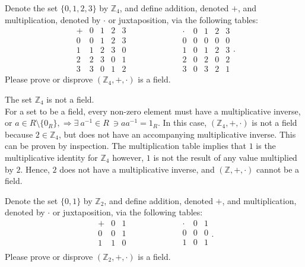 \documentclass{article}
\newcommand{\Z}{\mathbb{Z}}
\newcommand{\formatVerbalProof}[3]
{
	\noindent{\bf Claim #1:} #2
	\\[0.2cm]\noindent{\bf Proof #1:} #3
}
\begin{document}
   \vspace{0.1in}\par{} Denote the set $\{0,1,2,3\}$ by $\Z_4$, and define addition, denoted $+$, and multiplication, denoted by $\cdot$ or juxtaposition, via the following tables:
	   $$\begin{array}{c|cccc}
		 + & 0 & 1 & 2 & 3 \\ \hline
		 0 & 0 & 1 & 2 & 3 \\
	     1 & 1 & 2 & 3 & 0 \\
		 2 & 2 & 3 & 0 & 1 \\
		 3 & 3 & 0 & 1 & 2 \end{array} \hspace{1in}
		 \begin{array}{c|cccc} 
		 \cdot & 0 & 1 & 2 & 3 \\ \hline 
         0     & 0 & 0 & 0 & 0 \\
		 1     & 0 & 1 & 2 & 3 \\
		 2     & 0 & 2 & 0 & 2 \\
	     3     & 0 & 3 & 2 & 1 \end{array}.$$
	Please prove or disprove $(\Z_4, + , \cdot)$ is a field.

	\vspace{0.1in}\par\formatVerbalProof{2}{The set $\mathbb{Z}_4$ is not a field.}
	{ For a set to be a field, every non-zero element must have a multiplicative inverse, or $a \in R\setminus \{0_R\}, \Rightarrow \exists \ a^{-1} \in R \ \ni aa^{-1} = 1_R$. In this case, $\left( \mathbb{Z}_4,+,\cdot\right)$ is not a field because $2\in \mathbb{Z}_4$, but does not have an accompanying multiplicative inverse. This can be proven by inspection. The multiplication table implies that $1$ is the multiplicative identity for $\mathbb{Z}_4$ however, $1$ is not the result of any value multiplied by $2$.  Hence, $2$ does not have a multiplicative inverse, and $(\mathbb{Z},+,\cdot)$ cannot be a field.}

   \vspace{0.1in}\par{} Denote the set $\{0,1\}$ by $\Z_2$, and define addition, denoted $+$, and multiplication, denoted by $\cdot$ or juxtaposition, via the following tables:
   $$\begin{array}{c|cc}
	 + & 0 & 1 \\ \hline 
	 0 & 0 & 1 \\
	 1 & 1 & 0 \\
   \end{array} \hspace{1in}
   \begin{array}{c|cccc}
     \cdot & 0 & 1 \\ \hline 
	 0     & 0 & 0 \\
	 1     & 0 & 1 \\
   \end{array}.$$
   Please prove or disprove $(\Z_2, + , \cdot)$ is a field.
\end{document}
